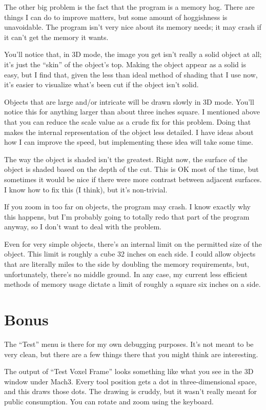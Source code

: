 \documentclass[titlepage,oneside,10pt]{article}
\begin{document}
The other big problem is the fact that the program is a memory
hog. There are things I can do to improve matters, but some
amount of hoggishness is unavoidable. The program isn't very nice
about its memory needs; it may crash if it can't get the memory it
wants.

You'll notice that, in 3D mode, the image you get isn't really a solid
object at all; it's just the ``skin'' of the object's top. Making the object
appear as a solid is easy, but I find that, given the less than ideal
method of shading that I use now, it's easier to visualize what's been
cut if the object isn't solid.

Objects that are large and/or intricate will be drawn slowly in 3D mode. You'll
notice this for anything larger than about three inches square. I
mentioned above that you can reduce the scale value as a crude
fix for this problem. Doing that makes the internal representation of the
object less detailed. I have ideas about how I can improve the speed, but
implementing these idea will take some time.

The way the object is shaded isn't the greatest. Right now, the
surface of the object is shaded based on the depth of the cut. This
is OK most of the time, but sometimes it would be nice if there were
more contrast between adjacent surfaces. I know how to fix this (I
think), but it's non-trivial.

If you zoom in too far on objects, the program may crash. I know
exactly why this happens, but I'm probably going to totally redo that
part of the program anyway, so I don't want to deal with the problem.

Even for very simple objects, there's an internal limit on the
permitted size of the object. This limit is roughly a cube 32 inches
on each side. I could allow objects that are literally miles to the side
by doubling the memory requirements, but, unfortunately, there's
no middle ground. In any case, my current less efficient methods of
memory usage dictate a limit of roughly a square six inches on a
side.

\section{Bonus}

The ``Test'' menu is there for my own debugging purposes. It's not
meant to be very clean, but there are a few things there that you
might think are interesting.

The output of ``Test Voxel Frame'' looks something like what you see
in the 3D window under Mach3. Every tool position gets a dot in
three-dimensional space, and this draws those dots. The drawing is
cruddy, but it wasn't really meant for public consumption. You can
rotate and zoom using the keyboard. 
\end{document}
